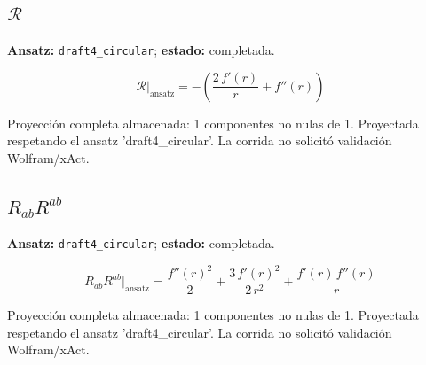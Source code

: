 \documentclass[11pt]{article}
\begin{document}
\subsection*{$ \mathcal{R} $}
\textbf{Ansatz:} \texttt{draft4\_circular}; \textbf{estado:} completada.\par
\begin{dmath*}[breakdepth={5}]
\mathcal{R}\big|_{\mathrm{ansatz}} = -\left(\frac{2\,f'\!\left(r\right)}{r} + f''\!\left(r\right)\right)
\end{dmath*}
\par\smallskip
Proyección completa almacenada: 1 componentes no nulas de 1. Proyectada respetando el ansatz 'draft4\_circular'. La corrida no solicitó validación Wolfram/xAct.\par\medskip
{}
\subsection*{$ R_{ab}R^{ab} $}
\textbf{Ansatz:} \texttt{draft4\_circular}; \textbf{estado:} completada.\par
\begin{dmath*}[breakdepth={5}]
R_{ab}R^{ab}\big|_{\mathrm{ansatz}} = \frac{{f''\!\left(r\right)}^{2}}{2} + \frac{3\,{f'\!\left(r\right)}^{2}}{2\,{r}^{2}} + \frac{f'\!\left(r\right)\,f''\!\left(r\right)}{r}
\end{dmath*}
\par\smallskip
Proyección completa almacenada: 1 componentes no nulas de 1. Proyectada respetando el ansatz 'draft4\_circular'. La corrida no solicitó validación Wolfram/xAct.\par\medskip
{}
\end{document}

